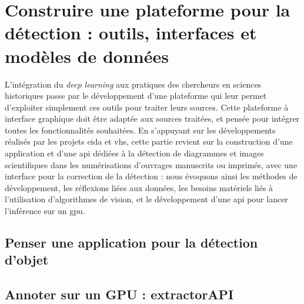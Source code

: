 \documentclass[a4paper,12pt,twoside]{book}
\newcommand{\api}{\gls{api}\xspace}
\newcommand{\eida}{\gls{eida}\xspace}
\newcommand{\gpu}{\gls{gpu}\xspace}
\newcommand{\vhs}{\gls{vhs}\xspace}
\begin{document}
        \chapter[Construire une plateforme pour la détection]{Construire une plateforme pour la détection : outils, interfaces et modèles de données}
        L'intégration du \textit{deep learning} aux pratiques des chercheurs en sciences historiques passe par le développement d'une plateforme qui leur permet d'exploiter simplement ces outils pour traiter leurs sources. Cette plateforme à interface graphique doit être adaptée aux sources traitées, et pensée pour intégrer toutes les fonctionnalités souhaitées. En s'appuyant sur les développements réalisés par les projets \eida et \vhs, cette partie revient sur la construction d'une application  et d'une \api dédiées à la détection de diagrammes et images scientifiques dans les numérisations d'ouvrages manuscrits ou imprimés, avec une interface pour la correction de la détection : nous évoquons ainsi les méthodes de développement, les réflexions liées aux données, les besoins matériels liés à l'utilisation d'algorithmes de vision, et le développement d'une \api pour lancer l'inférence sur un \gpu. 
         
            \section{\label{detectionApp}Penser une application pour la détection d'objet}
                
        
            \section{Annoter sur un GPU : extractorAPI}
                
        	\\
        
\end{document}
